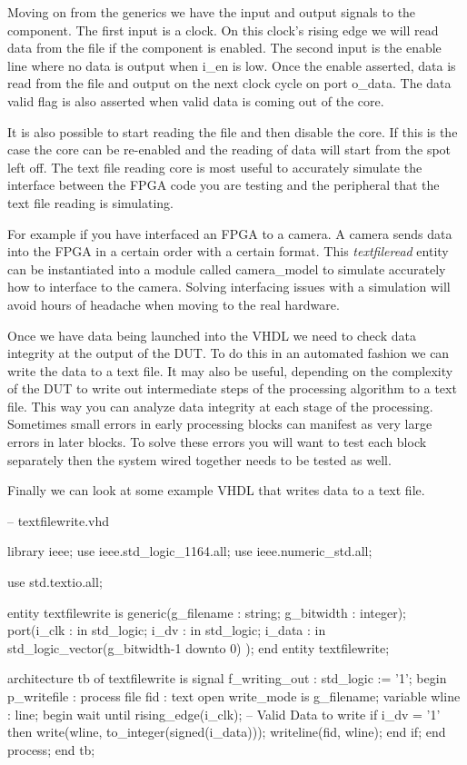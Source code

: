 Moving on from the generics we have the input and output signals to the component. The first input is a clock. On this clock's rising edge we will read data from the file if the component is enabled. The second input is the enable line where no data is output when i\_en is low. Once the enable asserted, data is read from the file and output on the next clock cycle on port o\_data. The data valid flag is also asserted when valid data is coming out of the core. 

It is also possible to start reading the file and then disable the core. If this is the case the core can be re-enabled and the reading of data will start from the spot left off. The text file reading core is most useful to accurately simulate the interface between the \ac{FPGA} code you are testing and the peripheral that the text file reading is simulating.

For example if you have interfaced an \ac{FPGA} to a camera. A camera sends data into the \ac{FPGA} in a certain order with a certain format. This \emph{textfileread} entity can be instantiated into a module called camera\_model to simulate accurately how to interface to the camera. Solving interfacing issues with a simulation will avoid hours of headache when moving to the real hardware. 

Once we have data being launched into the \ac{VHDL} we need to check data integrity at the output of the \ac{DUT}. To do this in an automated fashion we can write the data to a text file. It may also be useful, depending on the complexity of the \ac{DUT} to write out intermediate steps of the processing algorithm to a text file. This way you can analyze data integrity at each stage of the processing. Sometimes small errors in early processing blocks can manifest as very large errors in later blocks. To solve these errors you will want to test each block separately then the system wired together needs to be tested as well. 

Finally we can look at some example \ac{VHDL} that writes data to a text file. 

\begin{VHDLlisting}[tabsize=4]
-- textfilewrite.vhd

library	ieee;
    use ieee.std_logic_1164.all;
    use ieee.numeric_std.all;
    
    use std.textio.all;
	
entity textfilewrite is 
    generic(g_filename : string;
            g_bitwidth : integer);
    port(i_clk      : in    std_logic;
         i_dv       : in    std_logic;
         i_data     : in    std_logic_vector(g_bitwidth-1 downto 0)
    );
end entity textfilewrite;

architecture tb of textfilewrite is
    signal f_writing_out : std_logic := '1';
begin
    p_writefile : process
        file fid  : text open write_mode is g_filename;
        variable wline : line;
    begin
        wait until rising_edge(i_clk);
        -- Valid Data to write
        if i_dv = '1' then
            write(wline, to_integer(signed(i_data)));
            writeline(fid, wline);
        end if;
    end process;
end tb;
\end{VHDLlisting}

